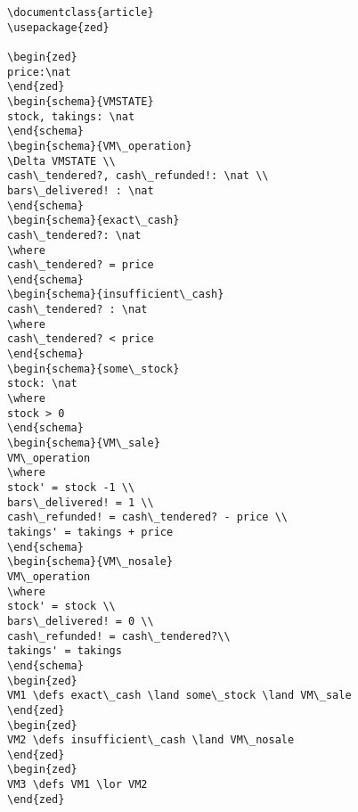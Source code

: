 \begin{verbatim}
\documentclass{article}
\usepackage{zed}

\begin{zed}
price:\nat
\end{zed}
\begin{schema}{VMSTATE}
stock, takings: \nat
\end{schema}
\begin{schema}{VM\_operation}
\Delta VMSTATE \\
cash\_tendered?, cash\_refunded!: \nat \\
bars\_delivered! : \nat
\end{schema}
\begin{schema}{exact\_cash}
cash\_tendered?: \nat
\where
cash\_tendered? = price
\end{schema}
\begin{schema}{insufficient\_cash}
cash\_tendered? : \nat
\where
cash\_tendered? < price
\end{schema}
\begin{schema}{some\_stock}
stock: \nat
\where
stock > 0
\end{schema}
\begin{schema}{VM\_sale}
VM\_operation
\where
stock' = stock -1 \\
bars\_delivered! = 1 \\
cash\_refunded! = cash\_tendered? - price \\
takings' = takings + price
\end{schema}
\begin{schema}{VM\_nosale}
VM\_operation
\where
stock' = stock \\
bars\_delivered! = 0 \\
cash\_refunded! = cash\_tendered?\\
takings' = takings
\end{schema}
\begin{zed}
VM1 \defs exact\_cash \land some\_stock \land VM\_sale
\end{zed}
\begin{zed}
VM2 \defs insufficient\_cash \land VM\_nosale
\end{zed}
\begin{zed}
VM3 \defs VM1 \lor VM2
\end{zed}

\end{verbatim}